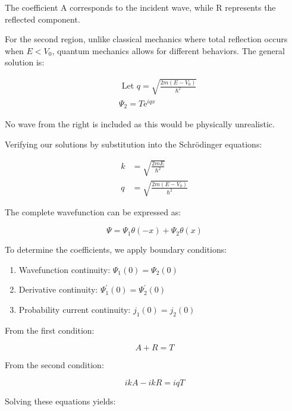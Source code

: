 \documentclass[italian]{HKNdocument}
\begin{document}
The coefficient A corresponds to the incident wave, while R represents the reflected component.

For the second region, unlike classical mechanics where total reflection occurs when $E < V_0$, quantum mechanics allows for different behaviors. The general solution is:

\begin{align*}
& \text { Let } q=\sqrt{\frac{2 m\left(E-V_{0}\right)}{\hbar^{2}}}  \tag{6.12}\\
& \Psi_{2}=T \mathrm{e}^{i q x}
\end{align*}

No wave from the right is included as this would be physically unrealistic.

Verifying our solutions by substitution into the Schrödinger equations:

\begin{align*}
k & =\sqrt{\frac{2 m E}{\hbar^{2}}}  \tag{6.13}\\
q & =\sqrt{\frac{2 m\left(E-V_{0}\right)}{\hbar^{2}}}
\end{align*}

The complete wavefunction can be expressed as:

\begin{equation*}
\Psi=\Psi_{1} \theta(-x)+\Psi_{2} \theta(x) \tag{6.14}
\end{equation*}

To determine the coefficients, we apply boundary conditions:

\begin{enumerate}
  \item Wavefunction continuity: $\Psi_{1}(0)=\Psi_{2}(0)$
  \item Derivative continuity: $\Psi_{1}^{\prime}(0)=\Psi_{2}^{\prime}(0)$
  \item Probability current continuity: $j_{1}(0)=j_{2}(0)$
\end{enumerate}

From the first condition:

\begin{equation*}
A+R=T \tag{6.15}
\end{equation*}

From the second condition:

\begin{equation*}
i k A-i k R=i q T \tag{6.16}
\end{equation*}

Solving these equations yields:
\end{document}
